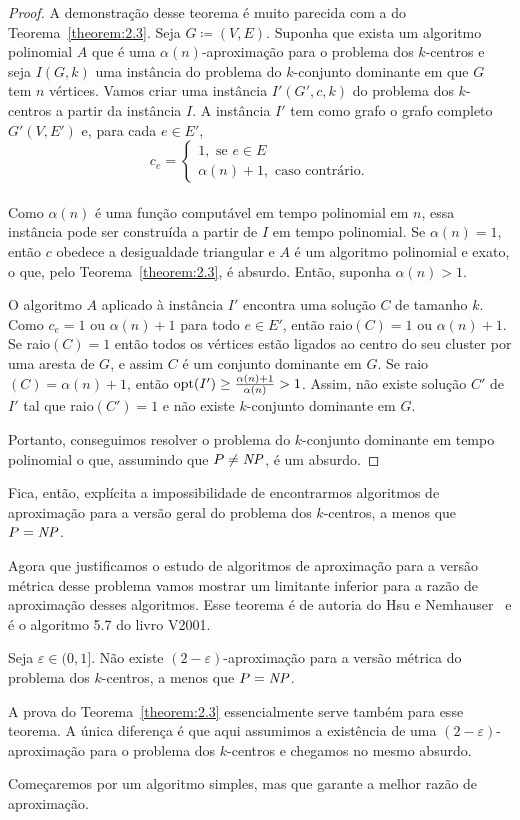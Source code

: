 \begin{proof}
    A demonstração desse teorema é muito parecida com a do Teorema~\ref{theorem:2.3}.
    Seja $G \coloneqq (V,E)$. Suponha que exista um algoritmo polinomial $A$ que é uma $\alpha(n)$-aproximação para o problema dos $k$-centros e seja $I(G,k)$ uma instância do problema do $k$-conjunto dominante em que $G$ tem $n$ vértices. Vamos criar uma instância $I'(G',c,k)$ do problema dos $k$-centros a partir da instância $I$. A instância $I'$ tem como grafo o grafo completo $G'(V,E')$ e, para cada $e \in E'$,
    \[c_e = \begin{cases}
            1, \text{ se } e \in E \\
            \alpha(n)+1, \text{ caso contrário.} 
            \end{cases}\]\\
    Como $\alpha(n)$ é uma função computável em tempo polinomial em $n$, essa instância pode ser construída a partir de $I$ em tempo polinomial.
    Se $\alpha(n)=1$, então $c$ obedece a desigualdade triangular e $A$ é um algoritmo polinomial e exato, o que, pelo Teorema~\ref{theorem:2.3}, é absurdo. Então, suponha $\alpha(n)>1$.

    O algoritmo $A$ aplicado à instância $I'$ encontra uma solução $C$ de tamanho $k$. Como $c_e = 1$ ou $\alpha(n)+1$ para todo $e \in E'$, então raio$(C)=1$ ou $\alpha(n)+1$.
    Se raio$(C)=1$ então todos os vértices estão ligados ao centro do seu cluster por uma aresta de $G$, e assim $C$ é um conjunto dominante em $G$.
    Se raio$(C) = \alpha(n) + 1$, então $\mathrm{opt}(I') \geq \frac{\alpha(n)+1}{\alpha(n)}>1$. Assim, não existe solução $C'$ de $I'$ tal que raio$(C')=1$ e não existe $k$-conjunto dominante em $G$.

    Portanto, conseguimos resolver o problema do $k$-conjunto dominante em tempo polinomial o que, assumindo que $P \neq \mathit{NP}$, é um absurdo.
\end{proof}
    Fica, então, explícita a impossibilidade de encontrarmos algoritmos de aproximação para a versão geral do problema dos $k$-centros, a menos que $P = \mathit{NP}$.

    Agora que justificamos o estudo de algoritmos de aproximação para a versão métrica desse problema vamos mostrar um limitante inferior para a razão de aproximação desses algoritmos. Esse teorema é de autoria do Hsu e Nemhauser~\cite{HSU1979209} e é o algoritmo 5.7 do livro V2001.
    
    \begin{theorem}
        Seja $\varepsilon \in (0,1]$. Não existe $(2-\varepsilon)$-aproximação para a versão métrica do problema dos $k$-centros, a menos que $P=\mathit{NP}$.
    \end{theorem}
    A prova do Teorema~\ref{theorem:2.3} essencialmente serve também para esse teorema. A única diferença é que aqui assumimos a existência de uma $(2 - \varepsilon)$-aproximação para o problema dos $k$-centros e chegamos no mesmo absurdo.

    Começaremos por um algoritmo simples, mas que garante a melhor razão de aproximação.